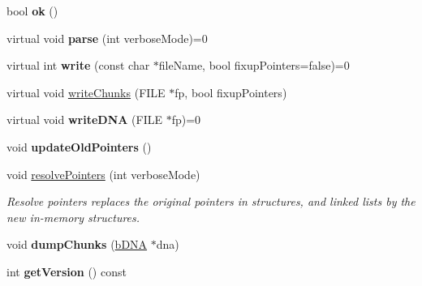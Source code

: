 \begin{DoxyCompactItemize}
\item 
\hypertarget{classb_parse_1_1b_file_aecc27a47399e6b4b9c9c228897d9bfd0}{bool {\bfseries ok} ()}\label{classb_parse_1_1b_file_aecc27a47399e6b4b9c9c228897d9bfd0}

\item 
\hypertarget{classb_parse_1_1b_file_aa1cf9d0f7fef00c210f8bb31f542cf9f}{virtual void {\bfseries parse} (int verbose\+Mode)=0}\label{classb_parse_1_1b_file_aa1cf9d0f7fef00c210f8bb31f542cf9f}

\item 
\hypertarget{classb_parse_1_1b_file_ad9e7d8f8bcf188598d3ea4dd6b7db5f8}{virtual int {\bfseries write} (const char $\ast$file\+Name, bool fixup\+Pointers=false)=0}\label{classb_parse_1_1b_file_ad9e7d8f8bcf188598d3ea4dd6b7db5f8}

\item 
virtual void \hyperlink{classb_parse_1_1b_file_a783f3e51f415da9508b4e3ad334bfd9e}{write\+Chunks} (F\+I\+L\+E $\ast$fp, bool fixup\+Pointers)
\item 
\hypertarget{classb_parse_1_1b_file_aef4111a6a1db20bb3e8ce490beebac07}{virtual void {\bfseries write\+D\+N\+A} (F\+I\+L\+E $\ast$fp)=0}\label{classb_parse_1_1b_file_aef4111a6a1db20bb3e8ce490beebac07}

\item 
\hypertarget{classb_parse_1_1b_file_a8363416a68247420e7eb8c4d047da519}{void {\bfseries update\+Old\+Pointers} ()}\label{classb_parse_1_1b_file_a8363416a68247420e7eb8c4d047da519}

\item 
\hypertarget{classb_parse_1_1b_file_a63c3401de979c154d289c4a87d53940a}{void \hyperlink{classb_parse_1_1b_file_a63c3401de979c154d289c4a87d53940a}{resolve\+Pointers} (int verbose\+Mode)}\label{classb_parse_1_1b_file_a63c3401de979c154d289c4a87d53940a}

\begin{DoxyCompactList}\small\item\em Resolve pointers replaces the original pointers in structures, and linked lists by the new in-\/memory structures. \end{DoxyCompactList}\item 
\hypertarget{classb_parse_1_1b_file_a5672615cad648147bab62149e4e9651f}{void {\bfseries dump\+Chunks} (\hyperlink{classb_parse_1_1b_d_n_a}{b\+D\+N\+A} $\ast$dna)}\label{classb_parse_1_1b_file_a5672615cad648147bab62149e4e9651f}

\item 
\hypertarget{classb_parse_1_1b_file_accb2aa4350081543a47ee660e6915ea4}{int {\bfseries get\+Version} () const }\label{classb_parse_1_1b_file_accb2aa4350081543a47ee660e6915ea4}


\end{DoxyCompactItemize}
